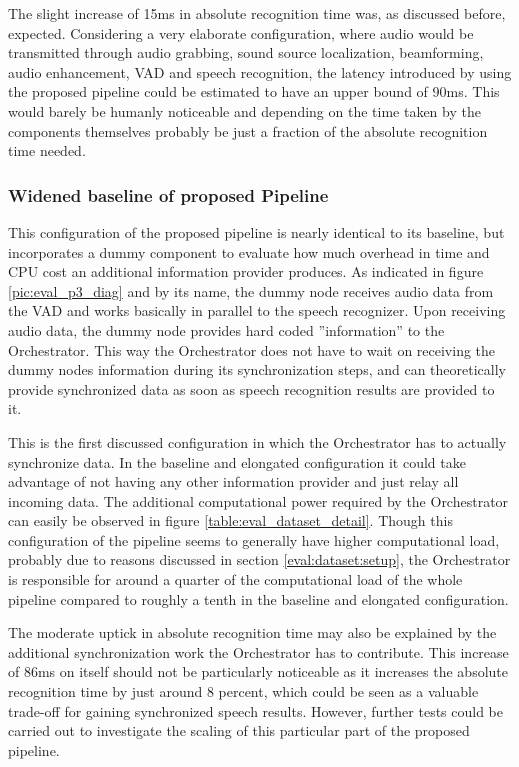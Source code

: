 The slight increase of 15ms in absolute recognition time was, as discussed before, expected.
Considering a very elaborate configuration, where audio would be transmitted through audio grabbing, sound source localization, beamforming, audio enhancement, VAD and speech recognition, the latency introduced by using the proposed pipeline could be estimated to have an upper bound of 90ms.
This would barely be humanly noticeable and depending on the time taken by the components themselves probably be just a fraction of the absolute recognition time needed.


\subsubsection{Widened baseline of proposed Pipeline}
This configuration of the proposed pipeline is nearly identical to its baseline, but incorporates a dummy component to evaluate how much overhead in time and CPU cost an additional information provider produces.
As indicated in figure \ref{pic:eval_p3_diag} and by its name, the dummy node receives audio data from the VAD and works basically in parallel to the speech recognizer.
Upon receiving audio data, the dummy node provides hard coded ''information'' to the Orchestrator.
This way the Orchestrator does not have to wait on receiving the dummy nodes information during its synchronization steps, and can theoretically provide synchronized data as soon as speech recognition results are provided to it.

This is the first discussed configuration in which the Orchestrator has to actually synchronize data. 
In the baseline and elongated configuration it could take advantage of not having any other information provider and just relay all incoming data.
The additional computational power required by the Orchestrator can easily be observed in figure \ref{table:eval_dataset_detail}.
Though this configuration of the pipeline seems to generally have higher computational load, probably due to reasons discussed in section \ref{eval:dataset:setup}, the Orchestrator is responsible for around a quarter of the computational load of the whole pipeline compared to roughly a tenth in the baseline and elongated configuration.

The moderate uptick in absolute recognition time may also be explained by the additional synchronization work the Orchestrator has to contribute. 
This increase of 86ms on itself should not be particularly noticeable as it increases the absolute recognition time by just around 8 percent, which could be seen as a valuable trade-off for gaining synchronized speech results. 
However, further tests could be carried out to investigate the scaling of this particular part of the proposed pipeline.


